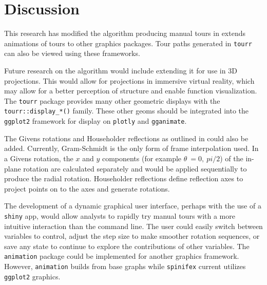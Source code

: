 \documentclass{monashthesis}
\begin{document}
\section{Discussion}\label{sec:discussion}

This research has modified the algorithm producing manual tours in
extends animations of tours to other graphics packages. Tour paths
generated in \texttt{tourr} can also be viewed using these frameworks.

Future research on the algorithm would include extending it for use in
3D projections. This would allow for projections in immersive virtual
reality, which may allow for a better perception of structure and enable
function visualization. The \texttt{tourr} package provides many other
geometric displays with the \texttt{tourr::display\_*()} family. These
other geoms should be integrated into the \texttt{ggplot2} framework for
display on \texttt{plotly} and \texttt{gganimate}.

The Givens rotations and Householder reflections as outlined in
\textcite{buja_computational_2005} could also be added. Currently,
Gram-Schmidt is the only form of frame interpolation used. In a Givens
rotation, the \(x\) and \(y\) components (for example
\(\theta~= 0,~pi/2\)) of the in-plane rotation are calculated separately
and would be applied sequentially to produce the radial rotation.
Householder reflections define reflection axes to project points on to
the axes and generate rotations.

The development of a dynamic graphical user interface, perhaps with the
use of a \texttt{shiny} app, would allow analysts to rapidly try manual
tours with a more intuitive interaction than the command line. The user
could easily switch between variables to control, adjust the step size
to make smoother rotation sequences, or save any state to continue to
explore the contributions of other variables. The \texttt{animation}
package \textcite{xie_animation:_2018} could be implemented for another
graphics framework. However, \texttt{animation} builds from base graphs
while \texttt{spinifex} current utilizes \texttt{ggplot2} graphics.

\printbibliography[heading=bibintoc]
\end{document}
